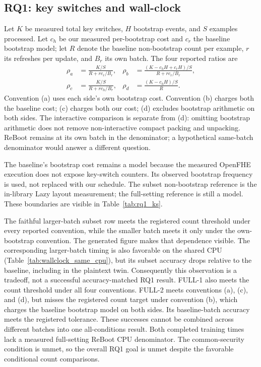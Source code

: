\subsection{RQ1: key switches and wall-clock}


Let $K$ be measured total key switches, $H$ bootstrap events, and $S$ examples processed. Let $c_h$ be our measured per-bootstrap cost and $c_r$ the baseline bootstrap model; let $R$ denote the baseline non-bootstrap count per example, $r$ its refreshes per update, and $B_r$ its own batch. The four reported ratios are
\begin{align}
 \rho_a&=\frac{K/S}{R+rc_r/B_r},&
 \rho_b&=\frac{(K-c_hH+c_rH)/S}{R+rc_r/B_r},\nonumber\\
 \rho_c&=\frac{K/S}{R+rc_h/B_r},&
 \rho_d&=\frac{(K-c_hH)/S}{R}.
 \label{eq:ratios}
\end{align}
Convention (a) uses each side's own bootstrap cost. Convention (b) charges both the baseline cost; (c) charges both our cost; (d) excludes bootstrap arithmetic on both sides. The interactive comparison is separate from (d): omitting bootstrap arithmetic does not remove non-interactive compact packing and unpacking. ReBoot remains at its own batch in the denominator; a hypothetical same-batch denominator would answer a different question.

The baseline's bootstrap cost remains a model because the measured OpenFHE execution does not expose key-switch counters. Its observed bootstrap frequency is used, not replaced with our schedule. The subset non-bootstrap reference is the in-library Lazy layout measurement; the full-setting reference is still a model. These boundaries are visible in Table~\ref{tab:rq1_ks}.


The faithful larger-batch subset row meets the registered count threshold under every reported convention, while the smaller batch meets it only under the own-bootstrap convention. The generated figure makes that dependence visible. The corresponding larger-batch timing is also favorable on the shared CPU (Table~\ref{tab:wallclock_same_cpu}), but its subset accuracy drops relative to the baseline, including in the plaintext twin. Consequently this observation is a tradeoff, not a successful accuracy-matched RQ1 result. FULL-1 also meets the count threshold under all four conventions. FULL-2 meets conventions (a), (c), and (d), but misses the registered count target under convention (b), which charges the baseline bootstrap model on both sides. Its baseline-batch accuracy meets the registered tolerance. These successes cannot be combined across different batches into one all-conditions result. Both completed training times lack a measured full-setting ReBoot CPU denominator. The common-security condition is unmet, so the overall RQ1 goal is unmet despite the favorable conditional count comparisons.

